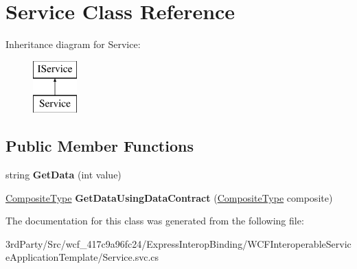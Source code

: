\hypertarget{class_service}{\section{Service Class Reference}
\label{class_service}
}
Inheritance diagram for Service\-:\begin{figure}[H]
\begin{center}
\leavevmode
\includegraphics[height=2.000000cm]{class_service}
\end{center}
\end{figure}
\subsection*{Public Member Functions}
\begin{DoxyCompactItemize}
\item 
\hypertarget{class_service_ac794a12b4434702ecbfd775eef8d4eba}{string {\bfseries Get\-Data} (int value)}\label{class_service_ac794a12b4434702ecbfd775eef8d4eba}

\item 
\hypertarget{class_service_a2d59c3f2b86fa8163f0c869a6ad85a65}{\hyperlink{class_composite_type}{Composite\-Type} {\bfseries Get\-Data\-Using\-Data\-Contract} (\hyperlink{class_composite_type}{Composite\-Type} composite)}\label{class_service_a2d59c3f2b86fa8163f0c869a6ad85a65}

\end{DoxyCompactItemize}


The documentation for this class was generated from the following file\-:\begin{DoxyCompactItemize}
\item 
3rd\-Party/\-Src/wcf\-\_\-417c9a96fc24/\-Express\-Interop\-Binding/\-W\-C\-F\-Interoperable\-Service\-Application\-Template/Service.\-svc.\-cs\end{DoxyCompactItemize}
